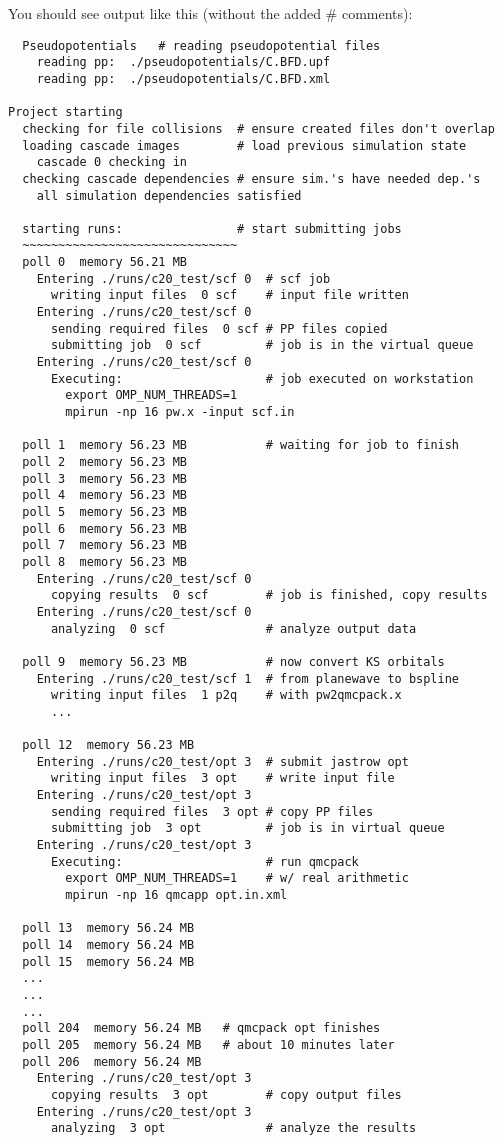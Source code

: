 \documentclass[oneside,11pt]{memoir}
\numberwithin{equation}{section}
\begin{document}
You should see output like this (without the added \# comments):
\begin{shaded}
\begin{verbatim}
  Pseudopotentials   # reading pseudopotential files
    reading pp:  ./pseudopotentials/C.BFD.upf
    reading pp:  ./pseudopotentials/C.BFD.xml

Project starting 
  checking for file collisions  # ensure created files don't overlap 
  loading cascade images        # load previous simulation state 
    cascade 0 checking in 
  checking cascade dependencies # ensure sim.'s have needed dep.'s
    all simulation dependencies satisfied 
  
  starting runs:                # start submitting jobs
  ~~~~~~~~~~~~~~~~~~~~~~~~~~~~~~
  poll 0  memory 56.21 MB 
    Entering ./runs/c20_test/scf 0  # scf job
      writing input files  0 scf    # input file written
    Entering ./runs/c20_test/scf 0 
      sending required files  0 scf # PP files copied
      submitting job  0 scf         # job is in the virtual queue
    Entering ./runs/c20_test/scf 0 
      Executing:                    # job executed on workstation
        export OMP_NUM_THREADS=1
        mpirun -np 16 pw.x -input scf.in 

  poll 1  memory 56.23 MB           # waiting for job to finish
  poll 2  memory 56.23 MB 
  poll 3  memory 56.23 MB 
  poll 4  memory 56.23 MB 
  poll 5  memory 56.23 MB 
  poll 6  memory 56.23 MB 
  poll 7  memory 56.23 MB 
  poll 8  memory 56.23 MB 
    Entering ./runs/c20_test/scf 0 
      copying results  0 scf        # job is finished, copy results
    Entering ./runs/c20_test/scf 0 
      analyzing  0 scf              # analyze output data
                                    
  poll 9  memory 56.23 MB           # now convert KS orbitals
    Entering ./runs/c20_test/scf 1  # from planewave to bspline
      writing input files  1 p2q    # with pw2qmcpack.x
      ...

  poll 12  memory 56.23 MB 
    Entering ./runs/c20_test/opt 3  # submit jastrow opt
      writing input files  3 opt    # write input file
    Entering ./runs/c20_test/opt 3 
      sending required files  3 opt # copy PP files
      submitting job  3 opt         # job is in virtual queue
    Entering ./runs/c20_test/opt 3 
      Executing:                    # run qmcpack
        export OMP_NUM_THREADS=1    # w/ real arithmetic
        mpirun -np 16 qmcapp opt.in.xml 

  poll 13  memory 56.24 MB 
  poll 14  memory 56.24 MB 
  poll 15  memory 56.24 MB 
  ...
  ...
  ...
  poll 204  memory 56.24 MB   # qmcpack opt finishes
  poll 205  memory 56.24 MB   # about 10 minutes later
  poll 206  memory 56.24 MB 
    Entering ./runs/c20_test/opt 3 
      copying results  3 opt        # copy output files
    Entering ./runs/c20_test/opt 3 
      analyzing  3 opt              # analyze the results


\end{verbatim}
\end{shaded}
\end{document}
